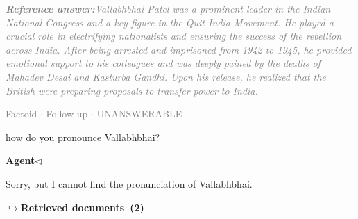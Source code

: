 \documentclass[a4paper,11pt]{article}
\begin{document}
\begin{refanswerenv}
{\footnotesize\textit{\textcolor{gray}{\textbf{Reference answer:}\enspace Vallabhbhai Patel was a prominent leader in the Indian National Congress and a key figure in the Quit India Movement. He played a crucial role in electrifying nationalists and ensuring the success of the rebellion across India. After being arrested and imprisoned from 1942 to 1945, he provided emotional support to his colleagues and was deeply pained by the deaths of Mahadev Desai and Kasturba Gandhi. Upon his release, he realized that the British were preparing proposals to transfer power to India.}}}
\end{refanswerenv}
\vspace{0.5em}
\hfill{\tiny\textcolor{gray}{Factoid $\cdot$ Follow-up $\cdot$ UNANSWERABLE}}
\begin{userbubble}
how do you pronounce Vallabhbhai?
\end{userbubble}
\noindent\hfill{\small\textcolor{agentcolor}{\textbf{Agent\enspace$\triangleleft$}}}
\begin{agentbubble}
Sorry, but I cannot find the pronunciation of Vallabhbhai.
\end{agentbubble}
\noindent\hfill{\footnotesize\textcolor{doccolor}{\textbf{$\hookrightarrow$\enspace Retrieved documents~(2)}}}
\end{document}
